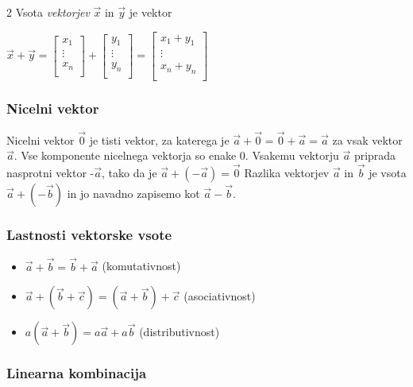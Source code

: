 \documentclass{article}
\begin{document}
\begin{multicols}{2}
	Vsota \textit{vektorjev} $\vec{x}$ in $\vec{y}$ je vektor
	\begin{center}
		$\vec{x} + \vec{y} =
			\begin{bmatrix}
				x_{1}  \\
				\vdots \\
				x_{n}  \\
			\end{bmatrix} +
			\begin{bmatrix}
				y_{1}  \\
				\vdots \\
				y_{n}  \\
			\end{bmatrix} =
			\begin{bmatrix}
				x_{1}  +  y_{1} \\
				\vdots          \\
				x_{n} + y_{n}   \\
			\end{bmatrix}
		$
	\end{center}

	\subsubsection{Nicelni vektor}

	Nicelni vektor $\vec{0}$ je tisti vektor, za katerega
	je $\vec{a} + \vec{0} = \vec{0} + \vec{a} = \vec{a}$ za vsak vektor
	$\vec{a}$. Vse komponente nicelnega vektorja so enake 0. Vsakemu vektorju
	$\vec{a}$ priprada nasprotni vektor -$\vec{a}$, tako da je $\vec{a} + (-\vec{a}) = \vec{0}$
	Razlika vektorjev $\vec{a}$ in $\vec{b}$ je vsota $\vec{a} + (-\vec{b})$ in jo
	navadno zapisemo kot  $\vec{a} - \vec{b}$.

	\subsubsection{Lastnosti vektorske vsote}

	\begin{itemize}
		\item $\vec{a} + \vec{b} = \vec{b} + \vec{a}$ (komutativnost)
		\item $\vec{a} + (\vec{b} + \vec{c}) = (\vec{a} + \vec{b}) + \vec{c}$ (asociativnost)
		\item $a(\vec{a} + \vec{b}) = a\vec{a} + a\vec{b}$ (distributivnost)
	\end{itemize}

	\subsubsection{Linearna kombinacija}


\end{multicols}
\end{document}
